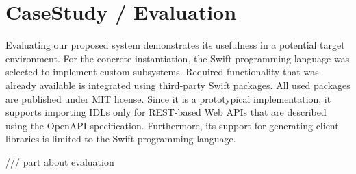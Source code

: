 \chapter{CaseStudy / Evaluation}
\label{ch:CaseStudyEvaluation}

Evaluating our proposed system demonstrates its usefulness in a potential target environment. For the concrete instantiation, the Swift programming language was selected to implement custom subsystems. Required functionality that was already available is integrated using third-party Swift packages. All used packages are published under MIT license. Since it is a prototypical implementation, it supports importing IDLs only for REST-based Web APIs that are described using the OpenAPI specification. Furthermore, its support for generating client libraries is limited to the Swift programming language.

/// part about evaluation 

\newpage

